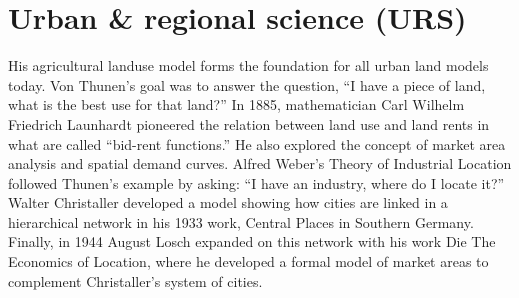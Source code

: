 





\section{Urban \& regional science (URS)}

His agricultural landuse model forms the foundation for all urban land models today. Von Thunen’s goal was to answer the question, “I have a piece of land, what is the best use for that land?”
In 1885, mathematician Carl Wilhelm Friedrich Launhardt pioneered the relation between land use and land rents in what are called “bid-rent functions.” He also explored the concept of market area analysis and spatial demand curves. Alfred Weber’s Theory of Industrial Location followed Thunen’s example by asking: “I have an industry, where do I locate it?” 
Walter Christaller developed a model showing how cities are linked in a hierarchical network in his 1933 work, Central Places in Southern Germany. Finally, in 1944 August Losch expanded on this network with his work Die The Economics of Location, where he developed a formal model of market areas to complement Christaller’s system of cities.


